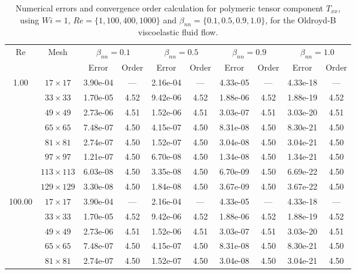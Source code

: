 \documentclass[preprint, 12pt]{elsarticle}
\begin{document}
\begin{center}
\begin{table}[H]
\caption{Numerical errors and convergence order calculation for polymeric tensor component $T_{xx}$, using $Wi=1$, $Re=\{1,100,400,1000\}$ and $\beta_{nn}=\{0.1,0.5,0.9,1.0\}$, for the Oldroyd-B viscoelastic fluid flow.\label{tab_OldroydBTxxResumida}}
\scriptsize{
    \begin{tabular*}{\textwidth}{@{\extracolsep\fill}cccccccccc@{}}
    \hline
    \multirow{2}{*}{$\operatorname{Re}$} & \multirow{2}{*}{Mesh} & \multicolumn{2}{c}{$\beta_{nn}=0.1$}  & \multicolumn{2}{c}{$\beta_{nn}=0.5$}  & \multicolumn{2}{c}{$\beta_{nn}=0.9$}  & \multicolumn{2}{c}{$\beta_{nn}=1.0$}\\ %
     & & Error & Order & Error & Order & Error & Order & Error & Order \\
    \hline
    \multirow{7}{*}{1.00} & $17\times 17$ & 3.90e-04 & --- & 2.16e-04 & --- & 4.33e-05 & --- & 4.33e-18 & --- \\
    & $33\times 33$ & 1.70e-05 & 4.52 & 9.42e-06 & 4.52 & 1.88e-06 & 4.52 & 1.88e-19 & 4.52 \\
    & $49\times 49$ & 2.73e-06 & 4.51 & 1.52e-06 & 4.51 & 3.03e-07 & 4.51 & 3.03e-20 & 4.51 \\
    & $65\times 65$ & 7.48e-07 & 4.50 & 4.15e-07 & 4.50 & 8.31e-08 & 4.50 & 8.30e-21 & 4.50 \\
    & $81\times 81$ & 2.74e-07 & 4.50 & 1.52e-07 & 4.50 & 3.04e-08 & 4.50 & 3.04e-21 & 4.50 \\
    & $97\times 97$ & 1.21e-07 & 4.50 & 6.70e-08 & 4.50 & 1.34e-08 & 4.50 & 1.34e-21 & 4.50 \\
    & $113\times 113$ & 6.03e-08 & 4.50 & 3.35e-08 & 4.50 & 6.70e-09 & 4.50 & 6.69e-22 & 4.50 \\
    & $129\times 129$ & 3.30e-08 & 4.50 & 1.84e-08 & 4.50 & 3.67e-09 & 4.50 & 3.67e-22 & 4.50 \\
    \hline\hline
    \multirow{7}{*}{100.00} & $17\times 17$ & 3.90e-04 & --- & 2.16e-04 & --- & 4.33e-05 & --- & 4.33e-18 & --- \\
    & $33\times 33$ & 1.70e-05 & 4.52 & 9.42e-06 & 4.52 & 1.88e-06 & 4.52 & 1.88e-19 & 4.52 \\
    & $49\times 49$ & 2.73e-06 & 4.51 & 1.52e-06 & 4.51 & 3.03e-07 & 4.51 & 3.03e-20 & 4.51 \\
    & $65\times 65$ & 7.48e-07 & 4.50 & 4.15e-07 & 4.50 & 8.31e-08 & 4.50 & 8.30e-21 & 4.50 \\
    & $81\times 81$ & 2.74e-07 & 4.50 & 1.52e-07 & 4.50 & 3.04e-08 & 4.50 & 3.04e-21 & 4.50 \\

\end{tabular*}}
\end{table}
\end{center}
\end{document}
